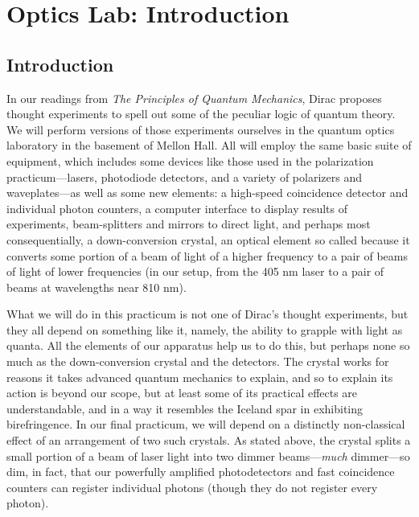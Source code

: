 \chapter{Optics Lab: Introduction}



\section*{Introduction}

In our readings from \emph{The Principles of Quantum Mechanics}, Dirac proposes thought experiments to spell out some of the peculiar logic of quantum theory. We will perform versions of those experiments ourselves in the quantum optics laboratory in the basement of Mellon Hall. All will employ the same basic suite of equipment, which includes some devices like those used in the polarization practicum---lasers, photodiode detectors, and a variety of polarizers and waveplates---as well as some new elements: a high-speed coincidence detector and individual photon counters, a computer interface to display results of experiments, beam-splitters and mirrors to direct light, and perhaps most consequentially, a down-conversion crystal, an optical element so called because it converts some portion of a beam of light of a higher frequency to a pair of beams of light of lower frequencies (in our setup, from the 405 nm laser to a pair of beams at wavelengths near 810 nm).

What we will do in this practicum is not one of Dirac's thought experiments, but they all depend on something like it, namely, the ability to grapple with light as quanta. All the elements of our apparatus help us to do this, but perhaps none so much as the down-conversion crystal and the detectors. The crystal works for reasons it takes advanced quantum mechanics to explain, and so to explain its action is beyond our scope, but at least some of its practical effects are understandable, and in a way it resembles the Iceland spar in exhibiting birefringence. In our final practicum, we will depend on a distinctly non-classical effect of an arrangement of two such crystals. As stated above, the crystal splits a small portion of a beam of laser light into two dimmer beams---\emph{much} dimmer---so dim, in fact, that our powerfully amplified photodetectors and fast coincidence counters can register individual photons (though they do not register every photon).

